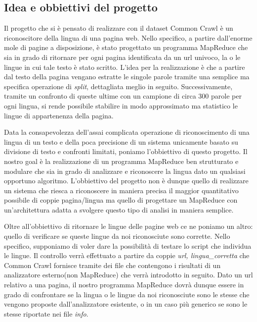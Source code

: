 \documentclass{article}
\newcommand{\MR}{MapReduce}
\newcommand{\info}{\textit{info}}
\newcommand{\CC}{Common Crawl}
\begin{document}
\subsection{Idea e obbiettivi del progetto}
Il progetto che si è pensato di realizzare con il dataset \CC{} è un riconoscitore della lingua di una pagina web. Nello specifico, a partire dall'enorme mole di pagine a disposizione, è stato progettato un programma \MR{} che sia in grado di ritornare per ogni pagina identificata da un url univoco, la o le lingue in cui tale testo è stato scritto. L'idea per la realizzazione è che a partire dal testo della pagina vengano estratte le singole parole tramite una semplice ma specifica operazione di \textit{split}, dettagliata meglio in seguito. Successivamente, tramite un confronto di queste ultime con un campione di circa 300 parole per ogni lingua, si rende possibile stabilire in modo approssimato ma statistico le lingue di appartenenza della pagina.

Data la consapevolezza dell'assai complicata operazione di riconoscimento di una lingua di un testo e della poca precisione di un sistema unicamente basato su divisione di testo e confronti limitati, poniamo l'obbiettivo di questo progetto. Il nostro goal è la realizzazione di un programma \MR{} ben strutturato e modulare che sia in grado di analizzare e riconoscere la lingua dato un qualsiasi opportuno algoritmo.
L'obbiettivo del progetto non è dunque quello di realizzare un sistema che riesca a riconoscere in maniera precisa il maggior quantitativo possibile di coppie pagina/lingua ma quello di progettare un \MR{} con un'architettura adatta a svolgere questo tipo di analisi in maniera semplice.

Oltre all'obbiettivo di ritornare le lingue delle pagine web ce ne poniamo un altro: quello di verificare se queste lingue da noi riconosciute sono corrette. Nello specifico, supponiamo di voler dare la possibilità di testare lo script che individua le lingue. Il controllo verrà effettuato a partire da coppie \textit{\textlangle url, lingua\_corretta\textrangle} che \CC{} fornisce tramite dei file che contengono i risultati di un analizzatore esterno(non \MR{}) che verrà introdotto in seguito. Dato un url relativo a una pagina, il nostro programma \MR{} dovrà dunque essere in grado di confrontare se la lingua o le lingue da noi riconosciute sono le stesse che vengono proposte dall'analizzatore esistente, o in un caso più generico se sono le stesse riportate nei file \info{}.

\end{document}
